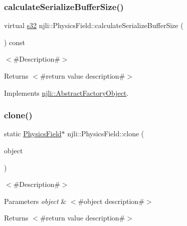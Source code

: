\subsubsection{\texorpdfstring{calculate\+Serialize\+Buffer\+Size()}{calculateSerializeBufferSize()}}
{\footnotesize\ttfamily virtual \mbox{\hyperlink{_util_8h_aa62c75d314a0d1f37f79c4b73b2292e2}{s32}} njli\+::\+Physics\+Field\+::calculate\+Serialize\+Buffer\+Size (\begin{DoxyParamCaption}{ }\end{DoxyParamCaption}) const\hspace{0.3cm}{\ttfamily [virtual]}}

$<$\#\+Description\#$>$

\begin{DoxyReturn}{Returns}
$<$\#return value description\#$>$ 
\end{DoxyReturn}


Implements \mbox{\hyperlink{classnjli_1_1_abstract_factory_object_a4763d05bc9dc37c559111f8bb30e1dd8}{njli\+::\+Abstract\+Factory\+Object}}.

\mbox{\label{classnjli_1_1_physics_field_ab77b1adf0af32187fef707b33332ed80}} 
\subsubsection{\texorpdfstring{clone()}{clone()}}
{\footnotesize\ttfamily static \mbox{\hyperlink{classnjli_1_1_physics_field}{Physics\+Field}}$\ast$ njli\+::\+Physics\+Field\+::clone (\begin{DoxyParamCaption}\item[{const \mbox{\hyperlink{classnjli_1_1_physics_field}{Physics\+Field}} \&}]{object }\end{DoxyParamCaption})\hspace{0.3cm}{\ttfamily [static]}}

$<$\#\+Description\#$>$


\begin{DoxyParams}{Parameters}
{\em object} & $<$\#object description\#$>$\\
\hline
\end{DoxyParams}
\begin{DoxyReturn}{Returns}
$<$\#return value description\#$>$ 
\end{DoxyReturn}
\mbox{\label{classnjli_1_1_physics_field_a5fe0a67fa8b3648d408c4ba38c43aba8}} 
